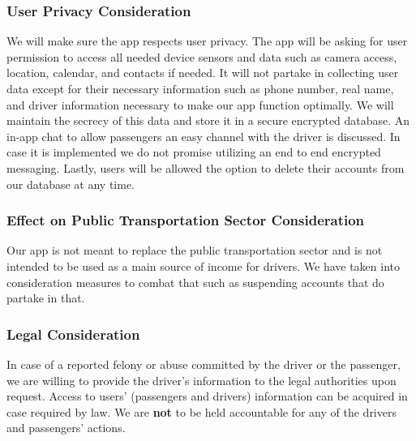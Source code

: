 \documentclass[a4paper, 12pt]{report} %
\begin{document}
                \subsubsection{User Privacy Consideration}
                    We will make sure the app respects user privacy. The app will be asking for user permission to access all needed device sensors and data such as camera access, location, calendar, and contacts if needed. It will not partake in collecting user data except for their necessary information such as phone number, real name, and driver information necessary to make our app function optimally. We will maintain the secrecy of this data and store it in a secure encrypted database. An in-app chat to allow passengers an easy channel with the driver is discussed. In case it is implemented we do not promise utilizing an end to end encrypted messaging. Lastly, users will be allowed the option to delete their accounts from our database at any time. 
                \subsubsection{Effect on Public Transportation Sector Consideration}
                    Our app is not meant to replace the public transportation sector and is not intended to be used as a main source of income for drivers. We have taken into consideration measures to combat that such as suspending accounts that do partake in that.
                \subsubsection{Legal Consideration}
                    In case of a reported felony or abuse committed by the driver or the passenger, we are willing to provide the driver's information to the legal authorities upon request. Access to users' (passengers and drivers) information can be acquired in case required by law. We are \textbf{not} to be held accountable for any of the drivers and passengers' actions.

        \pagebreak
\end{document}
